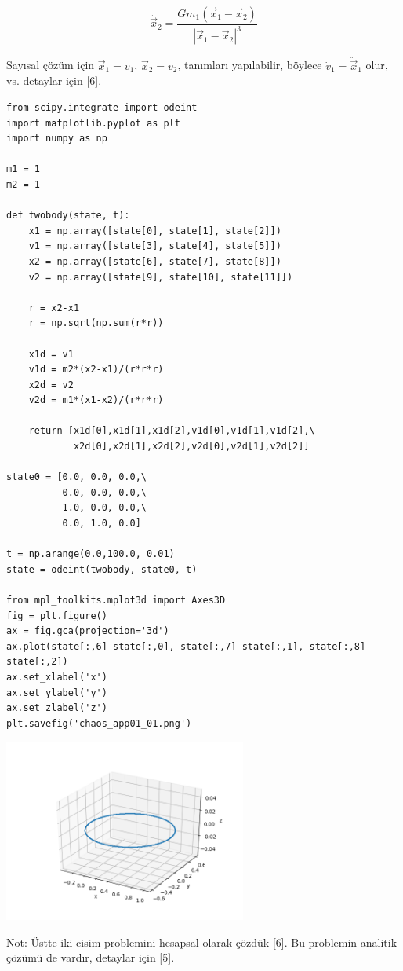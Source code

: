 \documentclass[12pt,fleqn]{article}\usepackage{../../common}
\begin{document}
$$ \ddot{\vec{x}}_2  = \frac{G m_1 (\vec{x}_1-\vec{x}_2)  }{ | \vec{x}_1 - \vec{x}_2|^3  }$$

Sayısal çözüm için $\dot{\vec{x}}_1 = v_1$, $\dot{\vec{x}}_2 = v_2$,
tanımları yapılabilir, böylece $\dot{v}_1 = \ddot{\vec{x}}_1$ olur, vs.
detaylar için [6].

\begin{verbatim}
from scipy.integrate import odeint
import matplotlib.pyplot as plt
import numpy as np

m1 = 1
m2 = 1

def twobody(state, t):
    x1 = np.array([state[0], state[1], state[2]])
    v1 = np.array([state[3], state[4], state[5]])
    x2 = np.array([state[6], state[7], state[8]])
    v2 = np.array([state[9], state[10], state[11]])

    r = x2-x1
    r = np.sqrt(np.sum(r*r))

    x1d = v1
    v1d = m2*(x2-x1)/(r*r*r)
    x2d = v2
    v2d = m1*(x1-x2)/(r*r*r)

    return [x1d[0],x1d[1],x1d[2],v1d[0],v1d[1],v1d[2],\
            x2d[0],x2d[1],x2d[2],v2d[0],v2d[1],v2d[2]]

state0 = [0.0, 0.0, 0.0,\
          0.0, 0.0, 0.0,\
          1.0, 0.0, 0.0,\
          0.0, 1.0, 0.0]

t = np.arange(0.0,100.0, 0.01)
state = odeint(twobody, state0, t)

from mpl_toolkits.mplot3d import Axes3D
fig = plt.figure()
ax = fig.gca(projection='3d')
ax.plot(state[:,6]-state[:,0], state[:,7]-state[:,1], state[:,8]-state[:,2])
ax.set_xlabel('x')
ax.set_ylabel('y')
ax.set_zlabel('z')
plt.savefig('chaos_app01_01.png')
\end{verbatim}

\includegraphics[height=6cm]{chaos_app01_01.png}

Not: Üstte iki cisim problemini hesapsal olarak çözdük [6]. Bu problemin
analitik çözümü de vardır, detaylar için [5].
\end{document}
